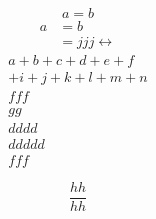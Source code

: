 \documentclass{article}
\begin{document}
\begin{equation*}
	a=b
\end{equation*}
\begin{equation}\begin{split}
a &=b\\
&=jjj\longleftrightarrow
\end{split}\end{equation}
\begin{multline}
a+b+c+d+e+f\\
+i+j+k+l+m+n\\
fff\\
gg\\
dddd\\
ddddd\\
fff
\end{multline}

\begin{equation}
\frac{hh}{hh}
\end{equation}
\end{document}
